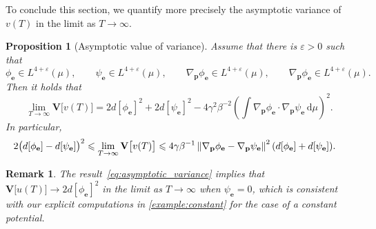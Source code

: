 \documentclass[11pt,a4paper]{article}
\newcommand{\var}[0]{\mathbf{V}}
\newcommand{\grad}{\nabla}
\newcommand{\vect}[1]{\boldsymbol{\mathbf #1}}
\renewcommand{\d}{\mathrm d}
\theoremstyle{plain}
\newtheorem{proposition}[theorem]{Proposition}
\newtheorem{remark}{Remark}[section]
\numberwithin{equation}{section}
\renewcommand{\leq}{\leqslant}
\begin{document}
To conclude this section,
we quantify more precisely the asymptotic variance of $v(T)$ in the limit as $T \to \infty$.
\begin{proposition}
    [Asymptotic value of variance]
    \label{proposition:asymptotic_variance}
    Assume that there is $\varepsilon > 0$ such that 
    \begin{equation}
        \label{eq:regularity_solution}
        \phi_{\vect e} \in L^{4+\varepsilon}(\mu),
        \qquad 
        \psi_{\vect e} \in L^{4+\varepsilon}(\mu),
        \qquad 
        \grad_{\vect p} \phi_{\vect e} \in L^{4+\varepsilon}(\mu),
        \qquad
        \grad_{\vect p} \phi_{\vect e} \in L^{4+\varepsilon}(\mu).
    \end{equation}
    Then it holds that
    \begin{equation}
        \label{eq:asymptotic_variance}
        \lim_{T \to \infty} \var\bigl[v(T)\bigr] =
        2 d[\phi_{\vect e}]^2 + 2 d[\psi_{\vect e}]^2 - 4 \gamma^2 \beta^{-2} \left( \int \grad_{\vect p} \phi_{\vect e} \cdot \grad_{\vect p} \psi_{\vect e} \, \d \mu \right)^2.
    \end{equation}
    In particular,
    \begin{align}
        \label{eq:bounds_asymptotic_variance}
        2\bigl( d[\phi_{\vect e}] - d[\psi_{\vect e}] \bigr)^2
        \leq \lim_{T \to \infty} \var \bigl[v(T)\bigr]
        &\leq 4 \gamma \beta^{-1} \norm{\grad_{\vect p} \phi_{\vect e} - \grad_{\vect p} \psi_{\vect e}}^2 (d[\phi_{\vect e}] + d[\psi_{\vect e}]).
    \end{align}
\end{proposition}
\begin{remark}
    The result~\eqref{eq:asymptotic_variance} implies that $\var\bigl[u(T)\bigr] \to 2 d[\phi_{\vect e}]^2$ in the limit as $T \to \infty$ when $\psi_{\vect e} = 0$,
    which is consistent with our explicit computations in \cref{example:constant} for the case of a constant potential.
\end{remark}
\end{document}
